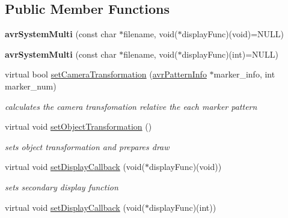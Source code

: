 \subsection*{Public Member Functions}
\begin{DoxyCompactItemize}
\item 
\hypertarget{classavr_system_multi_a5c2395b00dfbcfc5fe8381131997901a}{{\bfseries avr\-System\-Multi} (const char $\ast$filename, void($\ast$display\-Func)(void)=N\-U\-L\-L)}\label{classavr_system_multi_a5c2395b00dfbcfc5fe8381131997901a}

\item 
\hypertarget{classavr_system_multi_aeef640459bbbd037d6d64ce9587c37d6}{{\bfseries avr\-System\-Multi} (const char $\ast$filename, void($\ast$display\-Func)(int)=N\-U\-L\-L)}\label{classavr_system_multi_aeef640459bbbd037d6d64ce9587c37d6}

\item 
\hypertarget{classavr_system_multi_a96fe92b1d7cc08dfb4e8f57d7f0c7d17}{virtual bool \hyperlink{classavr_system_multi_a96fe92b1d7cc08dfb4e8f57d7f0c7d17}{set\-Camera\-Transformation} (\hyperlink{classavr_pattern_info}{avr\-Pattern\-Info} $\ast$marker\-\_\-info, int marker\-\_\-num)}\label{classavr_system_multi_a96fe92b1d7cc08dfb4e8f57d7f0c7d17}

\begin{DoxyCompactList}\small\item\em calculates the camera transfomation relative the each marker pattern \end{DoxyCompactList}\item 
\hypertarget{classavr_system_multi_adeba14fe5306c1c6aad82b2c5103fadf}{virtual void \hyperlink{classavr_system_multi_adeba14fe5306c1c6aad82b2c5103fadf}{set\-Object\-Transformation} ()}\label{classavr_system_multi_adeba14fe5306c1c6aad82b2c5103fadf}

\begin{DoxyCompactList}\small\item\em sets object transformation and prepares draw \end{DoxyCompactList}\item 
\hypertarget{classavr_system_multi_afa378d6fb53f7ee831e1f4acb6214eeb}{virtual void \hyperlink{classavr_system_multi_afa378d6fb53f7ee831e1f4acb6214eeb}{set\-Display\-Callback} (void($\ast$display\-Func)(void))}\label{classavr_system_multi_afa378d6fb53f7ee831e1f4acb6214eeb}

\begin{DoxyCompactList}\small\item\em sets secondary display function \end{DoxyCompactList}\item 
\hypertarget{classavr_system_multi_ae477c6fd28db9f09c98b71def0e5c041}{virtual void \hyperlink{classavr_system_multi_ae477c6fd28db9f09c98b71def0e5c041}{set\-Display\-Callback} (void($\ast$display\-Func)(int))}\label{classavr_system_multi_ae477c6fd28db9f09c98b71def0e5c041}


\end{DoxyCompactItemize}
